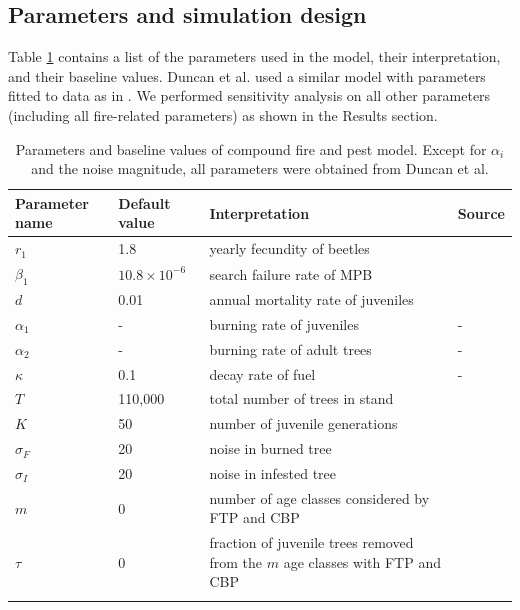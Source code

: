 \subsection{Parameters and simulation design}

Table \ref{params} contains a list of the parameters used in the model, their interpretation, and their baseline values. Duncan et al. used a similar model with parameters fitted to data as in \cite{agne2016fire}. We performed sensitivity analysis on all other parameters (including all fire-related parameters) as shown in the Results section.

\begin{table}

\centering
\caption{Parameters and baseline values of compound fire and pest model. Except for $\alpha_i$ and the noise magnitude, all parameters were obtained from Duncan et al. \cite{duncan2015model}}

\begin{tabular}{l l p{5cm} l}
\hline\noalign{\smallskip}
  Parameter name & Default value & Interpretation & Source \\
\hline\noalign{\smallskip}
  $r_1$ & 1.8  & yearly fecundity of beetles & \cite{powell2009connecting}  \\
  $\beta_1$ & $10.8 \times 10^{-6}$  & search failure rate of MPB & \cite{powell2009connecting}   \\
  $d$ & 0.01  & annual mortality rate of juveniles & \cite{duncan2015model}  \\
  $\alpha_1$& - & burning rate of juveniles & - \\
  $\alpha_2$& - & burning rate of adult trees & - \\
  $\kappa$& 0.1 & decay rate of fuel & - \\
  $T$ & 110,000 & total number of trees in stand & \cite{powell2009connecting} \\
  $K$ & 50 & number of juvenile generations & \cite{duncan2015model} \\
  $\sigma_F$ & 20 & noise in burned tree\\
  $\sigma_I$ & 20 & noise in infested tree\\
  $m$ & 0 & number of age classes considered by FTP and CBP\\
  $\tau$ & 0 & fraction of juvenile trees removed from the $m$  age classes with FTP and CBP\\

\hline\noalign{\smallskip}
\end{tabular}
 \protect \label{params}
\end{table}
\normalsize

